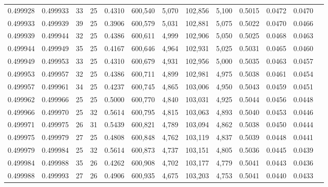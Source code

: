 \begin{tabular}{rrrrrrrrrrrrr}
0.499928 & 0.499933 &    33 &  25 &                                     0.4310 & 600,540 &   5,070 & 102,856 &   5,100 & 0.5015 & 0.0472 & 0.0470 \\
0.499933 & 0.499939 &    39 &  25 &                                     0.3906 & 600,579 &   5,031 & 102,881 &   5,075 & 0.5022 & 0.0470 & 0.0466 \\
0.499939 & 0.499944 &    32 &  25 &                                     0.4386 & 600,611 &   4,999 & 102,906 &   5,050 & 0.5025 & 0.0468 & 0.0463 \\
0.499944 & 0.499949 &    35 &  25 &                                     0.4167 & 600,646 &   4,964 & 102,931 &   5,025 & 0.5031 & 0.0465 & 0.0460 \\
0.499949 & 0.499953 &    33 &  25 &                                     0.4310 & 600,679 &   4,931 & 102,956 &   5,000 & 0.5035 & 0.0463 & 0.0457 \\
0.499953 & 0.499957 &    32 &  25 &                                     0.4386 & 600,711 &   4,899 & 102,981 &   4,975 & 0.5038 & 0.0461 & 0.0454 \\
0.499957 & 0.499961 &    34 &  25 &                                     0.4237 & 600,745 &   4,865 & 103,006 &   4,950 & 0.5043 & 0.0459 & 0.0451 \\
0.499962 & 0.499966 &    25 &  25 &                                     0.5000 & 600,770 &   4,840 & 103,031 &   4,925 & 0.5044 & 0.0456 & 0.0448 \\
0.499966 & 0.499970 &    25 &  32 &                                     0.5614 & 600,795 &   4,815 & 103,063 &   4,893 & 0.5040 & 0.0453 & 0.0446 \\
0.499971 & 0.499975 &    26 &  31 &                                     0.5439 & 600,821 &   4,789 & 103,094 &   4,862 & 0.5038 & 0.0450 & 0.0444 \\
0.499975 & 0.499979 &    27 &  25 &                                     0.4808 & 600,848 &   4,762 & 103,119 &   4,837 & 0.5039 & 0.0448 & 0.0441 \\
0.499979 & 0.499984 &    25 &  32 &                                     0.5614 & 600,873 &   4,737 & 103,151 &   4,805 & 0.5036 & 0.0445 & 0.0439 \\
0.499984 & 0.499988 &    35 &  26 &                                     0.4262 & 600,908 &   4,702 & 103,177 &   4,779 & 0.5041 & 0.0443 & 0.0436 \\
0.499988 & 0.499993 &    27 &  26 &                                     0.4906 & 600,935 &   4,675 & 103,203 &   4,753 & 0.5041 & 0.0440 & 0.0433 \\

\end{tabular}
